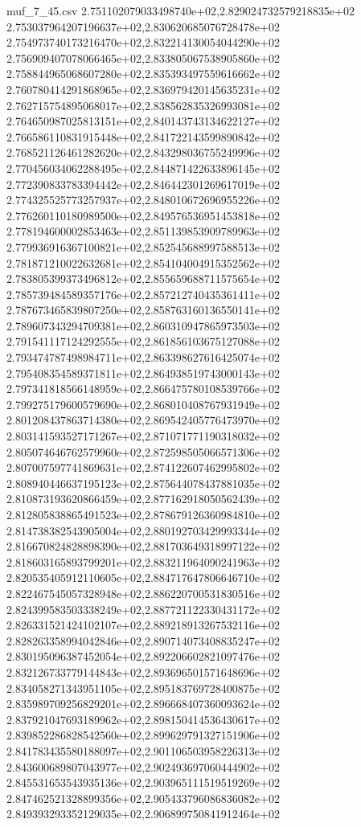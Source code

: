 \begin{filecontents*}{muf_7_45.csv}
2.751102079033498740e+02,2.829024732579218835e+02
2.753037964207196637e+02,2.830620685076728478e+02
2.754973740173216470e+02,2.832214130054044290e+02
2.756909407078066465e+02,2.833805067538905860e+02
2.758844965068607280e+02,2.835393497559616662e+02
2.760780414291868965e+02,2.836979420145635231e+02
2.762715754895068017e+02,2.838562835326993081e+02
2.764650987025813151e+02,2.840143743134622127e+02
2.766586110831915448e+02,2.841722143599890842e+02
2.768521126461282620e+02,2.843298036755249996e+02
2.770456034062288495e+02,2.844871422633896145e+02
2.772390833783394442e+02,2.846442301269617019e+02
2.774325525773257937e+02,2.848010672696955226e+02
2.776260110180989500e+02,2.849576536951453818e+02
2.778194600002853463e+02,2.851139853909789963e+02
2.779936916367100821e+02,2.852545688997588513e+02
2.781871210022632681e+02,2.854104004915352562e+02
2.783805399373496812e+02,2.855659688711575654e+02
2.785739484589357176e+02,2.857212740435361411e+02
2.787673465839807250e+02,2.858763160136550141e+02
2.789607343294709381e+02,2.860310947865973503e+02
2.791541117124292555e+02,2.861856103675127088e+02
2.793474787498984711e+02,2.863398627616425074e+02
2.795408354589371811e+02,2.864938519743000143e+02
2.797341818566148959e+02,2.866475780108539766e+02
2.799275179600579690e+02,2.868010408767931949e+02
2.801208437863714380e+02,2.869542405776473970e+02
2.803141593527171267e+02,2.871071771190318032e+02
2.805074646762579960e+02,2.872598505066571306e+02
2.807007597741869631e+02,2.874122607462995802e+02
2.808940446637195123e+02,2.875644078437881035e+02
2.810873193620866459e+02,2.877162918050562439e+02
2.812805838865491523e+02,2.878679126360984810e+02
2.814738382543905004e+02,2.880192703429993344e+02
2.816670824828898390e+02,2.881703649318997122e+02
2.818603165893799201e+02,2.883211964090241963e+02
2.820535405912110605e+02,2.884717647806646710e+02
2.822467545057328948e+02,2.886220700531830516e+02
2.824399583503338249e+02,2.887721122330431172e+02
2.826331521424102107e+02,2.889218913267532116e+02
2.828263358994042846e+02,2.890714073408835247e+02
2.830195096387452054e+02,2.892206602821097476e+02
2.832126733779144843e+02,2.893696501571648696e+02
2.834058271343951105e+02,2.895183769728400875e+02
2.835989709256829201e+02,2.896668407360093624e+02
2.837921047693189962e+02,2.898150414536430617e+02
2.839852286828542560e+02,2.899629791327151906e+02
2.841783435580188097e+02,2.901106503958226313e+02
2.843600689807043977e+02,2.902493697060444902e+02
2.845531653543935136e+02,2.903965111519519269e+02
2.847462521328899356e+02,2.905433796086836082e+02
2.849393293352129035e+02,2.906899750841912464e+02

\end{filecontents*}
